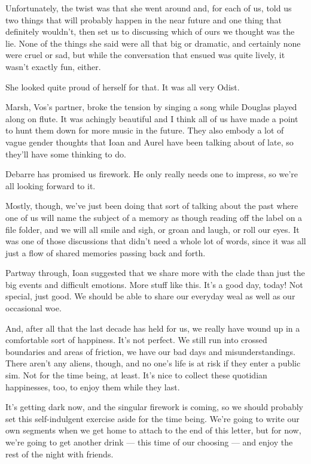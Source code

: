 Unfortunately, the twist was that she went around and, for each of us, told us two things that will probably happen in the near future and one thing that definitely wouldn't, then set us to discussing which of ours we thought was the lie. None of the things she said were all that big or dramatic, and certainly none were cruel or sad, but while the conversation that ensued was quite lively, it wasn't exactly fun, either.

She looked quite proud of herself for that. It was all very Odist.

Marsh, Vos's partner, broke the tension by singing a song while Douglas played along on flute. It was achingly beautiful and I think all of us have made a point to hunt them down for more music in the future. They also embody a lot of vague gender thoughts that Ioan and Aurel have been talking about of late, so they'll have some thinking to do.

Debarre has promised us firework. He only really needs one to impress, so we're all looking forward to it.

Mostly, though, we've just been doing that sort of talking about the past where one of us will name the subject of a memory as though reading off the label on a file folder, and we will all smile and sigh, or groan and laugh, or roll our eyes. It was one of those discussions that didn't need a whole lot of words, since it was all just a flow of shared memories passing back and forth.

Partway through, Ioan suggested that we share more with the clade than just the big events and difficult emotions. More stuff like this. It's a good day, today! Not special, just good. We should be able to share our everyday weal as well as our occasional woe.

And, after all that the last decade has held for us, we really have wound up in a comfortable sort of happiness. It's not perfect. We still run into crossed boundaries and areas of friction, we have our bad days and misunderstandings. There aren't any aliens, though, and no one's life is at risk if they enter a public sim. Not for the time being, at least. It's nice to collect these quotidian happinesses, too, to enjoy them while they last.

It's getting dark now, and the singular firework is coming, so we should probably set this self-indulgent exercise aside for the time being. We're going to write our own segments when we get home to attach to the end of this letter, but for now, we're going to get another drink — this time of our choosing — and enjoy the rest of the night with friends.

